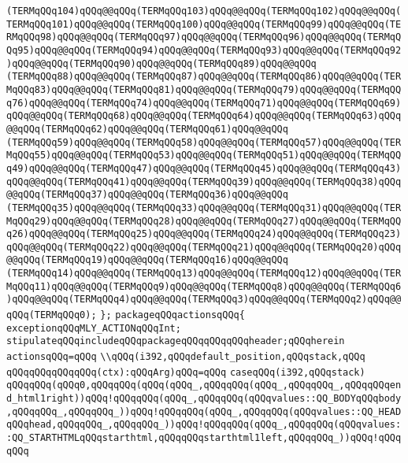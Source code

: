 \verb|(TERMqQQq104)qQQq@@qQQq(TERMqQQq103)qQQq@@qQQq(TERMqQQq102)qQQq@@qQQq(TERMqQQq101)qQQq@@qQQq(TERMqQQq100)qQQq@@qQQq(TERMqQQq99)qQQq@@qQQq(TERMqQQq98)qQQq@@qQQq(TERMqQQq97)qQQq@@qQQq(TERMqQQq96)qQQq@@qQQq(TERMqQQq95)qQQq@@qQQq(TERMqQQq94)qQQq@@qQQq(TERMqQQq93)qQQq@@qQQq(TERMqQQq92)qQQq@@qQQq(TERMqQQq90)qQQq@@qQQq(TERMqQQq89)qQQq@@qQQq|\newline
\verb|(TERMqQQq88)qQQq@@qQQq(TERMqQQq87)qQQq@@qQQq(TERMqQQq86)qQQq@@qQQq(TERMqQQq83)qQQq@@qQQq(TERMqQQq81)qQQq@@qQQq(TERMqQQq79)qQQq@@qQQq(TERMqQQq76)qQQq@@qQQq(TERMqQQq74)qQQq@@qQQq(TERMqQQq71)qQQq@@qQQq(TERMqQQq69)qQQq@@qQQq(TERMqQQq68)qQQq@@qQQq(TERMqQQq64)qQQq@@qQQq(TERMqQQq63)qQQq@@qQQq(TERMqQQq62)qQQq@@qQQq(TERMqQQq61)qQQq@@qQQq|\newline
\verb|(TERMqQQq59)qQQq@@qQQq(TERMqQQq58)qQQq@@qQQq(TERMqQQq57)qQQq@@qQQq(TERMqQQq55)qQQq@@qQQq(TERMqQQq53)qQQq@@qQQq(TERMqQQq51)qQQq@@qQQq(TERMqQQq49)qQQq@@qQQq(TERMqQQq47)qQQq@@qQQq(TERMqQQq45)qQQq@@qQQq(TERMqQQq43)qQQq@@qQQq(TERMqQQq41)qQQq@@qQQq(TERMqQQq39)qQQq@@qQQq(TERMqQQq38)qQQq@@qQQq(TERMqQQq37)qQQq@@qQQq(TERMqQQq36)qQQq@@qQQq|\newline
\verb|(TERMqQQq35)qQQq@@qQQq(TERMqQQq33)qQQq@@qQQq(TERMqQQq31)qQQq@@qQQq(TERMqQQq29)qQQq@@qQQq(TERMqQQq28)qQQq@@qQQq(TERMqQQq27)qQQq@@qQQq(TERMqQQq26)qQQq@@qQQq(TERMqQQq25)qQQq@@qQQq(TERMqQQq24)qQQq@@qQQq(TERMqQQq23)qQQq@@qQQq(TERMqQQq22)qQQq@@qQQq(TERMqQQq21)qQQq@@qQQq(TERMqQQq20)qQQq@@qQQq(TERMqQQq19)qQQq@@qQQq(TERMqQQq16)qQQq@@qQQq|\newline
\verb|(TERMqQQq14)qQQq@@qQQq(TERMqQQq13)qQQq@@qQQq(TERMqQQq12)qQQq@@qQQq(TERMqQQq11)qQQq@@qQQq(TERMqQQq9)qQQq@@qQQq(TERMqQQq8)qQQq@@qQQq(TERMqQQq6)qQQq@@qQQq(TERMqQQq4)qQQq@@qQQq(TERMqQQq3)qQQq@@qQQq(TERMqQQq2)qQQq@@qQQq(TERMqQQq0);|\newline
\verb|};|\newline
\verb|packageqQQqactionsqQQq{|\newline
\verb|exceptionqQQqMLY_ACTIONqQQqInt;|\newline
\verb|stipulateqQQqincludeqQQqpackageqQQqqQQqqQQqheader;qQQqherein|\newline
\verb|actionsqQQq=qQQq|\newline
\verb|\\qQQq(i392,qQQqdefault_position,qQQqstack,qQQq|\newline
\verb|qQQqqQQqqQQqqQQq(ctx):qQQqArg)qQQq=qQQq|\newline
\verb|caseqQQq(i392,qQQqstack)|\newline
\verb|qQQqqQQq(qQQq0,qQQqqQQq(qQQq(qQQq_,qQQqqQQq(qQQq_,qQQqqQQq_,qQQqqQQqend_html1right))qQQq!qQQqqQQq(qQQq_,qQQqqQQq(qQQqvalues::QQ_BODYqQQqbody,qQQqqQQq_,qQQqqQQq_))qQQq!qQQqqQQq(qQQq_,qQQqqQQq(qQQqvalues::QQ_HEADqQQqhead,qQQqqQQq_,qQQqqQQq_))qQQq!qQQqqQQq(qQQq_,qQQqqQQq(qQQqvalues::QQ_STARTHTMLqQQqstarthtml,qQQqqQQqstarthtml1left,qQQqqQQq_))qQQq!qQQqqQQq|\newline
